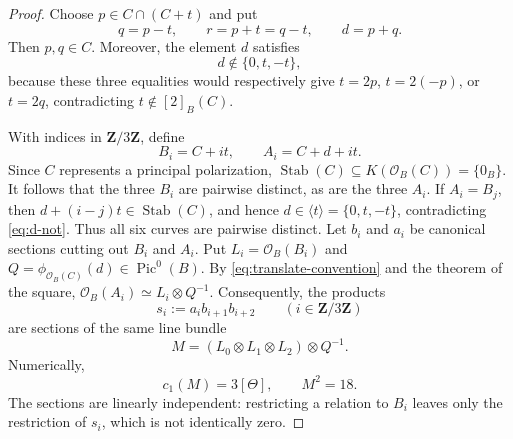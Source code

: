 \documentclass[10pt,a4paper]{amsart}
\newcommand{\Pic}{\operatorname{Pic}}
\newcommand{\Z}{\mathbf Z}
\newcommand{\cO}{\mathcal O}
\begin{document}
\begin{proof}
Choose $p\in C\cap(C+t)$ and put
\[
  q=p-t,\qquad r=p+t=q-t,\qquad d=p+q.
\]
Then $p,q\in C$.  Moreover, the element $d$ satisfies
\begin{equation}
  d\notin\{0,t,-t\},
\label{eq:d-not}
\end{equation}
because these three equalities would respectively give
$t=2p$, $t=2(-p)$, or $t=2q$, contradicting
$t\notin[2]_B(C)$.

With indices in $\Z/3\Z$, define
\[
  B_i=C+it,\qquad A_i=C+d+it.
\]
Since $C$ represents a principal polarization,
$\operatorname{Stab}(C)\subseteq K(\cO_B(C))=\{0_B\}$.
It follows that the three $B_i$ are pairwise distinct, as are the three
$A_i$.  If $A_i=B_j$, then
$d+(i-j)t\in\operatorname{Stab}(C)$, and hence
$d\in\langle t\rangle=\{0,t,-t\}$, contradicting
\eqref{eq:d-not}.  Thus all six curves are pairwise distinct.
Let $b_i$ and $a_i$ be canonical sections cutting out $B_i$ and $A_i$.
Put $L_i=\cO_B(B_i)$ and
$Q=\phi_{\cO_B(C)}(d)\in\Pic^0(B)$.  By
\eqref{eq:translate-convention} and the theorem of the square,
$\cO_B(A_i)\simeq L_i\otimes Q^{-1}$.
Consequently, the products
\[
  s_i:=a_i b_{i+1}b_{i+2}\qquad(i\in\Z/3\Z)
\]
are sections of the same line bundle
\[
  M=(L_0\otimes L_1\otimes L_2)\otimes Q^{-1}.
\]
Numerically,
\[
  c_1(M)=3[\Theta],\qquad M^2=18.
\]
The sections are linearly independent: restricting a relation to $B_i$
leaves only the restriction of $s_i$, which is not identically zero.


\end{proof}
\end{document}
